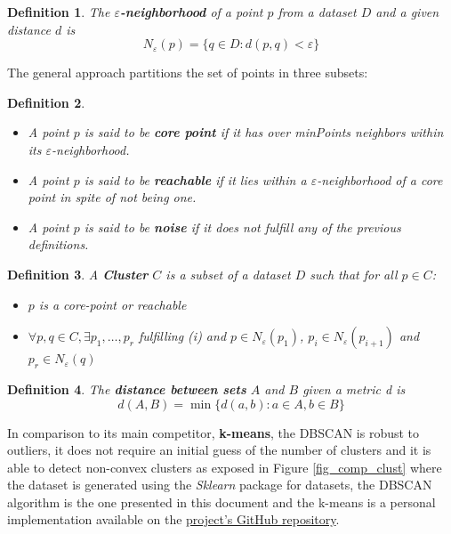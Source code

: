 \documentclass[10pt,journal,compsoc]{IEEEtran}
\newtheorem{definition}{Definition}
\begin{document}
\begin{definition}
The $\varepsilon$\textbf{-neighborhood} of a point $p$ from a dataset $D$ and a given distance $d$ is
$$N_{\varepsilon}(p) = \lbrace q \in D: d(p,q) < \varepsilon \rbrace$$ 
\end{definition}

The general approach partitions the set of points in three subsets:
\begin{definition}
\begin{itemize}
\item A point $p$ is said to be \textbf{\textit{core point}} if it has over \textit{minPoints} neighbors within its $\varepsilon$-neighborhood.
\item A point $p$ is said to be \textbf{\textit{reachable}} if it lies within a $\varepsilon$-neighborhood of a core point in spite of not being one.
\item A point $p$ is said to be \textbf{\textit{noise}} if it does not fulfill any of the previous definitions.
\end{itemize}
\end{definition}

\begin{definition}
A \textbf{Cluster} $C$ is a subset of a dataset $D$ such that for all $p \in C$:
\begin{itemize}
\item[(i)] $p$ is a core-point or reachable
\item[(ii)] $\forall p,q \in C, \exists p_1, \ldots,  p_r$ fulfilling (i) and $p \in N_{\varepsilon}(p_1)$, $p_i \in N_{\varepsilon}(p_{i+1})$ and $p_r \in N_{\varepsilon}(q)$
\end{itemize}
\end{definition}

\begin{definition} \label{def_distance}
The \textbf{distance between sets} $A$ and $B$ given a metric d is
$$d(A,B)=\min \lbrace d(a,b): a \in A, b \in B \rbrace$$
\end{definition}


In comparison to its main competitor, \textbf{k-means}, the DBSCAN is robust to outliers, it does not require an initial guess of the number of clusters and it is able to detect non-convex clusters as exposed in Figure \ref{fig_comp_clust} where the dataset is generated using the \textit{Sklearn} package for datasets, the DBSCAN algorithm is the one presented in this document and the k-means is a personal implementation available on the \href{https://github.com/csegarragonz/DBSCAN-pyCOMPSs}{project's GitHub repository}.
\end{document}
